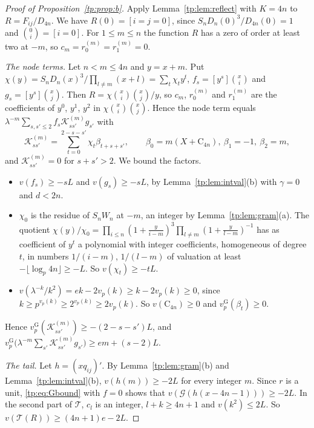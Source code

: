 \documentclass[11pt]{amsart}
\theoremstyle{definition}
\theoremstyle{remark}
\numberwithin{equation}{section}
\newcommand{\vG}{v_p^{\mathrm G}}
\begin{document}
\begin{proof}[Proof of Proposition~\ref{tp:prop:b}]
Apply Lemma~\ref{tp:lem:reflect} with $K=4n$ to $R=F_{ij}/D_{4n}$. We have $R(0)=[i=j=0]$, since
$S_nD_n(0)^3/D_{4n}(0)=1$ and $\binom0i=[i=0]$. For $1\le m\le n$ the function $R$ has a zero of order at least two at
$-m$, so $c_m=r_0^{(m)}=r_1^{(m)}=0$.

\emph{The node terms.} Let $n<m\le4n$ and $y=x+m$. Put
$\chi(y)=S_nD_n(x)^3/\prod_{l\ne m}(x+l)=\sum_t\chi_ty^t$, $f_s=[y^s]\binom xi$ and $g_s=[y^s]\binom xj$. Then
$R=\chi\binom xi\binom xj/y$, so $c_m$, $r_0^{(m)}$ and $r_1^{(m)}$ are the coefficients of $y^0$, $y^1$, $y^2$ in
$\chi\binom xi\binom xj$. Hence the node term equals $\lambda^{-m}\sum_{s,s'\le2}f_s\mathcal K^{(m)}_{ss'}g_{s'}$ with
\[
 \mathcal K^{(m)}_{ss'}=\sum_{t=0}^{2-s-s'}\chi_t\beta_{t+s+s'},\qquad
 \beta_0=m(X+\mathrm C_{4n}),\ \beta_1=-1,\ \beta_2=m,
\]
and $\mathcal K^{(m)}_{ss'}=0$ for $s+s'>2$. We bound the factors.
\begin{itemize}[leftmargin=*]
\item $v(f_s)\ge-sL$ and $v(g_s)\ge-sL$, by Lemma~\ref{tp:lem:intval}(b) with $\gamma=0$ and $d<2n$.
\item $\chi_0$ is the residue of $S_nW_n$ at $-m$, an integer by Lemma~\ref{tp:lem:gram}(a). The quotient
 $\chi(y)/\chi_0=\prod_{i\le n}(1+\frac y{i-m})^3\prod_{l\ne m}(1+\frac y{l-m})^{-1}$ has as coefficient of $y^t$
 a polynomial with integer coefficients, homogeneous of degree $t$, in numbers $1/(i-m)$, $1/(l-m)$ of valuation at
 least $-\lfloor\log_p4n\rfloor\ge-L$. So $v(\chi_t)\ge-tL$.
\item $v(\lambda^{-k}/k^2)=ek-2v_p(k)\ge k-2v_p(k)\ge0$, since $k\ge p^{v_p(k)}\ge2^{v_p(k)}\ge2v_p(k)$. So
 $v(\mathrm C_{4n})\ge0$ and $\vG(\beta_t)\ge0$.
\end{itemize}
Hence $\vG(\mathcal K^{(m)}_{ss'})\ge-(2-s-s')L$, and
$\vG\bigl(\lambda^{-m}\sum_{s'}\mathcal K^{(m)}_{ss'}g_{s'}\bigr)\ge em+(s-2)L$.

\emph{The tail.} Let $h=(xq_{ij})'$. By Lemma~\ref{tp:lem:gram}(b) and Lemma~\ref{tp:lem:intval}(b),
$v(h(m))\ge-2L$ for every integer $m$. Since $r$ is a unit, \eqref{tp:eq:Gbound} with $f=0$ shows that
$v(\mathcal G(h(x-4n-1)))\ge-2L$. In the second part of $\mathcal T$, $c_l$ is an integer, $l+k\ge4n+1$ and
$v(k^2)\le2L$. So $v(\mathcal T(R))\ge(4n+1)e-2L$.


\end{proof}
\end{document}

